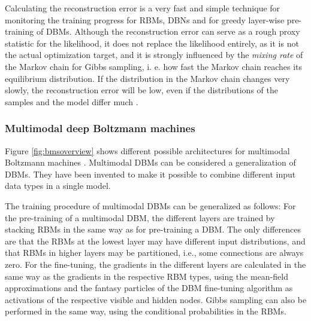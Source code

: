 \documentclass[12pt]{article}
\begin{document}
Calculating the reconstruction error  is a very fast and simple technique for monitoring the training progress for RBMs, DBNs and for greedy layer-wise pre-training of DBMs.
Although the reconstruction error can serve as a rough proxy statistic for the likelihood, it does not replace the likelihood entirely, as it is not the actual optimization target, and it is strongly influenced by the {\em mixing rate} of the Markov chain for Gibbs sampling, i. e. how fast the Markov chain reaches its equilibrium distribution. If the distribution in the Markov chain changes very slowly, the reconstruction error will be low, even if the distributions of the samples and the model differ much \citep{hinton_practical_2012}.

\subsubsection{Multimodal deep Boltzmann machines}

Figure \ref{fig:bmsoverview} shows different possible architectures for multimodal Boltzmann machines \citep{srivastava2012multimodal}.
Multimodal DBMs can be considered a generalization of DBMs.
They have been invented to make it possible to combine different input data types in a single model.

The training procedure of multimodal DBMs can be generalized as follows:
For the pre-training of a multimodal DBM, the different layers are trained by stacking RBMs in the same way as for pre-training a DBM.
The only differences are that the RBMs at the lowest layer may have different input distributions, and that RBMs in higher layers may be partitioned, i.e., some connections are always zero.
For the fine-tuning, the gradients in the different layers are calculated in the same way as the gradients in the respective RBM types, using the mean-field approximations and the fantasy particles of the DBM fine-tuning algorithm as activations of the respective visible and hidden nodes.
Gibbs sampling can also be performed in the same way, using the conditional probabilities in the RBMs.
\end{document}
